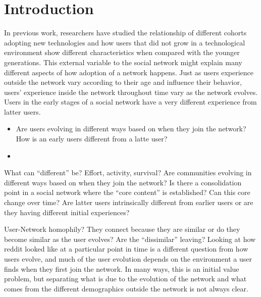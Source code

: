 \section{Introduction}

In previous work, researchers have studied the relationship of different cohorts adopting new technologies and how users that did not grow in a technological environment show different characteristics when compared with the younger generations. This external variable to the social network might explain many different aspects of how adoption of a network happens. Just as users experience outside the network vary according to their age and influence their behavior, users' experience inside the network throughout time vary as the network evolves. Users in the early stages of a social network have a very different experience from latter users.

\begin{itemize}
	\item Are users evolving in different ways based on when they join the network? How is an early users different from a latte user?
	\item 
\end{itemize}
What can ``different'' be? Effort, activity, survival?
Are communities evolving in different ways based on when they join the network?
Is there a consolidation point in a social network where the ``core content'' is established? Can this core change over time?
Are latter users intrinsically different from earlier users or are they having different initial experiences?

User-Network homophily? They connect because they are similar or do they become similar as the user evolves? Are the ``dissimilar'' leaving?
Looking at how reddit looked like at a particular point in time is a different question from how users evolve, and much of the user evolution depends on the environment a user finds when they first join the network. In many ways, this is an initial value problem, but separating what is due to the evolution of the network and what comes from the different demographics outside the network is not always clear.
